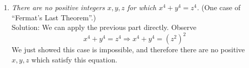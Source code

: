 \documentclass[10pt]{article}
\newcommand{\Z}{\mathbb{Z}}
\newcommand{\solution}{\color{blue} Solution: \color{black}}
\begin{document}
\begin{enumerate}
\begin{enumerate}
                As shown in lemma 3, we can see $m, n, m^2 + n^2$ must be perfect related to perfect squares. Then we can perform another layer of substitutions to see
                \[m = 2pq ~ n = p^2 - q^2, a = p^2 + q^2\]
                Using this, we can see
                \[b^2 = 2mn = 4pq(p^2 - q^2) = 4pq(p-q)(p+q)\]
                \[\Rightarrow \left(\frac{b}{2}\right)^2 = pq(p-q)(p+q)\]
                We know from lemma 3 these are all coprime and therefore each is itself a perfect square. Let $p = r^2$ and $q= s^2$ to obtain
                \[r^4 - s^4 = p^2 - q^2 = (p-q)(p+q) = k^2, ~\text{for some}~ k \in \Z\]
                Then we see this is a new solution to $a^4 - b^4 = c^2$, since $r^2 = p \leq p^2 + q^2 = a$, we have $r < a$, contradicting the minimality of $a$. $\hfill\blacksquare$

			\item \emph{There are no positive integers $x,y,z$ for which $x^4+y^4=z^4$.} (One case of ``Fermat's Last Theorem''.)\\
                
                \solution We can apply the previous part directly. Observe 
                \[x^4 + y^4 = z^4 \Rightarrow x^4 + y^4 = (z^2)^2\]
                We just showed this case is impossible, and therefore there are no positive $x,y,z$ which satisfy this equation.
		\end{enumerate}
		
		
	\end{enumerate}
	

\noindent \underline{\hspace{3in}}\\
\end{document}
